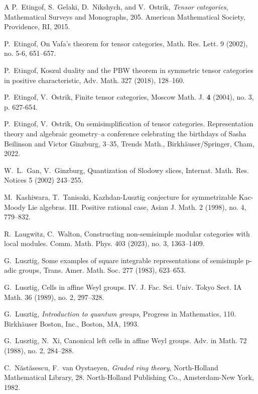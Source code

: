 \documentclass{amsart}
\theoremstyle{definition}
\numberwithin{equation}{section}
\begin{document}
\begin{thebibliography}{A}
P.~Etingof, S.~Gelaki, D.~Nikshych, and V.~Ostrik,
\textit{Tensor categories}, Mathematical Surveys and Monographs, 205. American Mathematical Society, Providence, RI, 2015.

 P.~Etingof, On Vafa's theorem for tensor categories,
Math. Res. Lett. 9 (2002), no. 5-6, 651--657.

 P.~Etingof, Koszul duality and the PBW theorem in symmetric tensor categories in positive characteristic,
Adv. Math. 327 (2018), 128--160.

 P.~Etingof, V.~Ostrik, Finite tensor categories, Moscow Math. J. 
{\bf 4} (2004), no. 3, p. 627-654.

 P.~Etingof, V.~Ostrik, On semisimplification of tensor categories. Representation theory and algebraic geometry--a conference celebrating the birthdays of Sasha Beilinson and Victor Ginzburg, 3--35, Trends Math., Birkh\"auser/Springer, Cham, 2022.

 W.~L.~Gan, V.~Ginzburg, Quantization of Slodowy slices, Internat. Math. Res. Notices 5 (2002) 243--255.

 M.~Kashiwara, T.~Tanisaki, Kazhdan-Lusztig conjecture for symmetrizable Kac-Moody Lie algebras. III. Positive rational case, Asian J. Math. 2 (1998), no. 4, 779--832.

 R.~Laugwitz, C.~Walton, Constructing non-semisimple modular categories with local modules. Comm. Math. Phys. 403 (2023), no. 3, 1363--1409.

 G.~Lusztig, Some examples of square integrable representations of semisimple p-adic groups, Trans. Amer. Math. Soc. 277 (1983), 623--653.

 G.~Lusztig, Cells in affine Weyl groups. IV. J. Fac. Sci. Univ. Tokyo Sect. IA Math. 36 (1989), no. 2, 297--328.

 G.~Lusztig, \textit{Introduction to quantum groups}, Progress in Mathematics, 110. Birkh\"auser Boston, Inc., Boston, MA, 1993.

 G.~Lusztig, N.~Xi, Canonical left cells in affine Weyl groups. Adv. in Math. 72 (1988), no. 2, 284--288.

 C.~N\u{a}st\u{a}sescu, F.~van Oystaeyen, \textit{Graded ring theory}, North-Holland Mathematical Library, 28. North-Holland Publishing Co., Amsterdam-New York, 1982.


\end{thebibliography}
\end{document}
